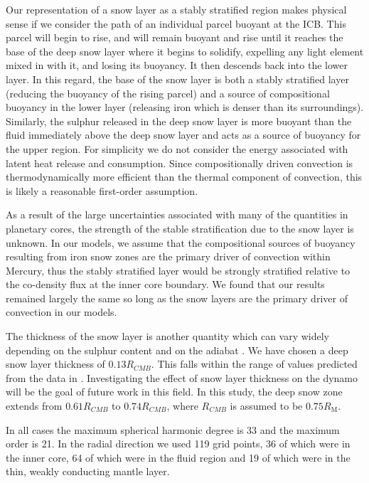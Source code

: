 Our representation of a snow layer as a stably stratified region makes physical sense if we consider the path of an individual parcel buoyant at the ICB. This parcel will begin to rise, and will remain buoyant and rise until it reaches the base of the deep snow layer where it begins to solidify, expelling any light element mixed in with it, and losing its buoyancy. It then descends back into the lower layer. In this regard, the base of the snow layer is both a stably stratified layer (reducing the buoyancy of the rising parcel) and a source of compositional buoyancy in the lower layer (releasing iron which is denser than its surroundings). Similarly, the sulphur released in the deep snow layer is more buoyant than the fluid immediately above the deep snow layer and acts as a source of buoyancy for the upper region. For simplicity we do not consider the energy associated with latent heat release and consumption. Since compositionally driven convection is thermodynamically more efficient than the thermal component of convection, this is likely a reasonable first-order assumption.

As a result of the large uncertainties associated with many of the quantities in planetary cores, the strength of the stable stratification due to the snow layer is unknown. In our models, we assume that the compositional sources of buoyancy resulting from iron snow zones are the primary driver of convection within Mercury, thus the stably stratified layer would be strongly stratified relative to the co-density flux at the inner core boundary. We found that our results remained largely the same so long as the snow layers are the primary driver of convection in our models.

The thickness of the snow layer is another quantity which can vary widely depending on the sulphur content and on the adiabat \citep{chenetal2008}. We have chosen a deep snow layer thickness of $0.13 R_{CMB}$. This falls within the range of values predicted from the data in \citet{chenetal2008}. Investigating the effect of snow layer thickness on the dynamo will be the goal of future work in this field. In this study, the deep snow zone extends from $0.61 R_{CMB}$ to $0.74 R_{CMB}$, where $R_{CMB}$ is assumed to be $0.75 R_{\textrm{M}}$.

In all cases the maximum spherical harmonic degree is 33 and the maximum order is 21. In the radial direction we used 119 grid points, 36 of which were in the inner core, 64 of which were in the fluid region and 19 of which were in the thin, weakly conducting mantle layer.

